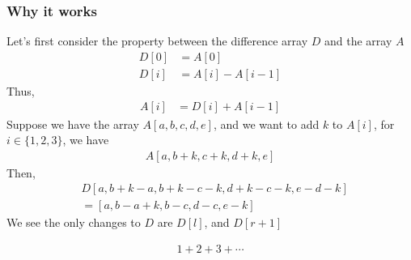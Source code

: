\documentclass{report}
\begin{document}
\bigbreak \noindent 
\subsubsection{Why it works}
\bigbreak \noindent 
Let's first consider the property between the difference array $D$ and the array $A$
\begin{align*}
    D[0] &= A[0] \\
    D[i] &= A[i] - A[i-1]
\end{align*}
Thus,
\begin{align*}
    A[i] &= D[i] + A[i-1]
\end{align*}
Suppose we have the array $A[a,b,c,d,e]$, and we want to add $k$ to $A[i]$, for $i \in \{1,2,3\} $, we have
\begin{align*}
    A[a,b+k, c+k, d+k, e]
\end{align*}
Then, 
\begin{align*}
    &D[a, b+k-a, b+k-c-k, d+k-c-k, e-d-k] \\
    &=[a, b-a+k, b-c, d-c, e-k]
\end{align*}
We see the only changes to $D$ are $D[l]$, and $D[r+1]$

\begin{align*}
    1 + 2 + 3 + \cdots
\end{align*}
\end{document}
